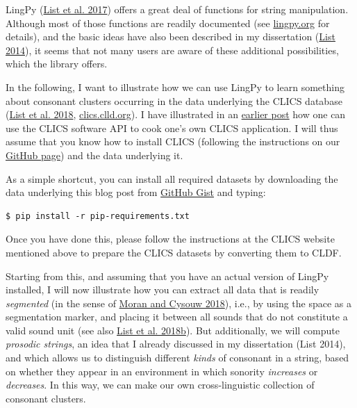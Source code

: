 \documentclass[
  english,
  a4paper,
  oneside,tablecaptionabove
]{scrbook}
\begin{document}
LingPy (\href{http://bibliography.lingpy.org?key=List2017i}{List et al.
2017}) offers a great deal of functions for string manipulation.
Although most of those functions are readily documented (see
\href{http://lingpy.org}{lingpy.org} for details), and the basic ideas
have also been described in my dissertation (\href{http://bibliography.lingpy.org?key=List2014d}{List 2014}), it
seems that not many users are aware of these additional possibilities,
which the library offers.

In the following, I want to illustrate how we can use LingPy to learn
something about consonant clusters occurring in the data underlying the
CLICS database (\href{http://bibliography.lingpy.org?key=List2018e}{List et al. 2018},
\href{https://clics.clld.org}{clics.clld.org}). I have illustrated in
an \href{https://calc.hypotheses.org/date/2018/08}{earlier post} how one
can use the CLICS software API to cook one's own CLICS application. I
will thus assume that you know how to install CLICS (following the
instructions on our \href{https://github.com/clics/clics2}{GitHub page}) and the data underlying it.

As a simple shortcut, you can install all required
datasets by downloading the data underlying this blog post from
\href{https://gist.github.com/LinguList/1056960125ca79428b420257fa4b02eb}{GitHub
Gist} and typing:

\begin{lstlisting}
$ pip install -r pip-requirements.txt
\end{lstlisting}

Once you have done this, please follow the instructions at the CLICS
website mentioned above to prepare the CLICS datasets by converting them
to CLDF.

Starting from this, and assuming that you have an actual version of
LingPy installed, I will now illustrate how you can extract all data
that is readily \emph{segmented} (in the sense of
\href{http://bibliography.lingpy.org?key=Moran2018}{Moran and Cysouw
2018}), i.e., by using the space as a segmentation marker, and placing
it between all sounds that do not constitute a valid sound unit (see
also \href{http://bibliography.lingpy.org?key=List2018d}{List et al.
2018b}). But additionally, we will compute \emph{prosodic strings}, an
idea that I already discussed in my dissertation (List 2014), and which
allows us to distinguish different \emph{kinds} of consonant in a
string, based on whether they appear in an environment in which sonority
\emph{increases} or \emph{decreases}. In this way, we can make our own
cross-linguistic collection of consonant clusters.
\end{document}
